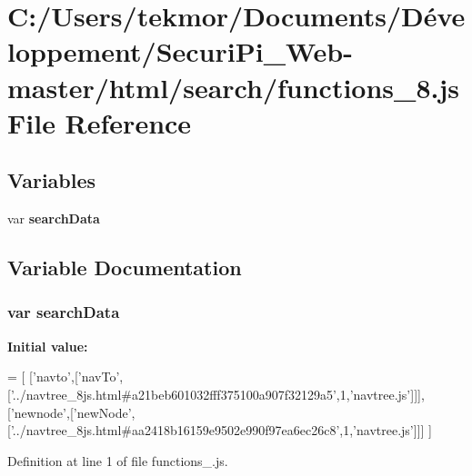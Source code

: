 \section{C\+:/\+Users/tekmor/\+Documents/\+Développement/\+Securi\+Pi\+\_\+\+Web-\/master/html/search/functions\+\_\+8.js File Reference}
\label{functions__8_8js}
\subsection*{Variables}
\begin{DoxyCompactItemize}
\item 
var {\bf search\+Data}
\end{DoxyCompactItemize}


\subsection{Variable Documentation}
\subsubsection[{search\+Data}]{\setlength{\rightskip}{0pt plus 5cm}var search\+Data}\label{functions__8_8js_ad01a7523f103d6242ef9b0451861231e}
{\bfseries Initial value\+:}
\begin{DoxyCode}
=
[
  [\textcolor{stringliteral}{'navto'},[\textcolor{stringliteral}{'navTo'},[\textcolor{stringliteral}{'../navtree\_8js.html#a21beb601032fff375100a907f32129a5'},1,\textcolor{stringliteral}{'navtree.js'}]]],
  [\textcolor{stringliteral}{'newnode'},[\textcolor{stringliteral}{'newNode'},[\textcolor{stringliteral}{'../navtree\_8js.html#aa2418b16159e9502e990f97ea6ec26c8'},1,\textcolor{stringliteral}{'navtree.js'}]]]
]
\end{DoxyCode}


Definition at line 1 of file functions\+\_.\+js.

